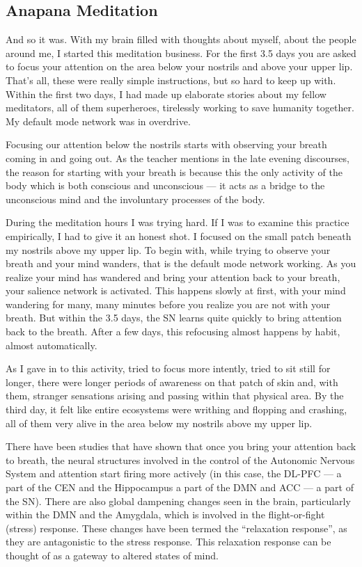 \documentclass[a4paper, amsfonts, amssymb, amsmath, reprint, showkeys, nofootinbib, twoside]{revtex4-1}
\begin{document}
\subsection{Anapana Meditation}

And so it was. With my brain filled with thoughts about myself, about the people
around me, I started this meditation business. For the first 3.5 days you are asked
to focus your attention on the area below your nostrils and above your upper
lip. That's all, these were really simple instructions, but so hard to keep up with.
Within the first two days, I had made up elaborate stories about my
fellow meditators, all of them superheroes, tirelessly working to save humanity
together. My default mode network was in overdrive.

Focusing our attention below the nostrils starts with observing your breath coming in
and going out. As the teacher mentions in the late evening discourses, the reason for
starting with your breath is because this the only activity of the body which is both
conscious and unconscious --- it acts as a bridge to the unconscious mind and the
involuntary processes of the body.

During the meditation hours I was trying hard. If I was to examine this practice
empirically, I had to give it an honest shot. I focused on the small patch beneath my
nostrils above my upper lip. To begin with, while trying to observe your breath and
your mind wanders, that is the default mode network working. As you realize your mind
has wandered and bring your attention back to your breath, your salience network is
activated. This happens slowly at first, with your mind wandering for many, many
minutes before you realize you are not with your breath. But within the 3.5 days, the
SN learns quite quickly to bring attention back to the breath. After a few days, this
refocusing almost happens by habit, almost automatically.

As I gave in to this activity, tried to focus more intently, tried to sit still for
longer, there were longer periods of awareness on that patch of skin and, with them,
stranger sensations arising and passing within that physical area. By the third day,
it felt like entire ecosystems were writhing and flopping and crashing, all of them
very alive in the area below my nostrils above my upper lip.

There have been studies that have shown that once you bring your 
attention back to breath, the neural structures involved in the control
of the Autonomic Nervous System and attention start firing more actively
(in this case, the DL-PFC --- a part of the CEN and the Hippocampus a part of the DMN 
and ACC --- a part of the SN). There are also global dampening changes seen in the brain, 
particularly within the DMN and the Amygdala, which is involved in
the flight-or-fight (stress) response. These changes have been
termed the ``relaxation response'', as they are antagonistic to the stress
response. This relaxation response can be thought of as a gateway to altered states
of mind. \cite{relaxationresponse}
\end{document}
